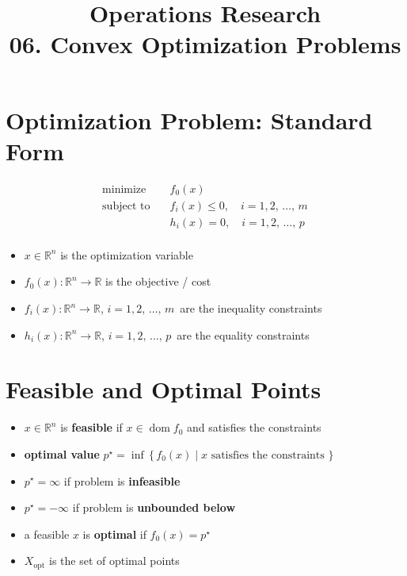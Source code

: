 \documentclass[11pt]{extarticle}
\newcommand{\ds}{\displaystyle}
\DeclareMathOperator*{\dom}{dom}
\theoremstyle{definition}
\begin{document}
\title{\texorpdfstring{\vspace{15mm} Operations Research\\ 06. Convex Optimization Problems}{Operations Research\\ 06. Convex Optimization Problems}} 
\author{}
\date{}
\maketitle
\newpage

\section*{Optimization Problem: Standard Form}

\vspace{5mm}
\begin{align*}
  \text{minimize}\quad &f_0(x) \\
  \text{subject to}\quad &f_i(x)\leqslant 0, \quad i = 1, 2,\,\ldots,\,m \\
  \qquad\qquad &h_i(x) = 0, \quad i = 1, 2,\,\ldots,\,p \\
\end{align*}
\begin{itemize}
  \item $\ds x\in\mathbb{R}^n$ is the optimization variable
  \item $\ds f_0(x):\mathbb{R}^n\to\mathbb{R}$ is the objective / cost 
  \item $\ds f_i(x):\mathbb{R}^n\to\mathbb{R}$, $i = 1, 2,\,\ldots,\,m\,$ are the inequality constraints 
  \item $\ds h_i(x):\mathbb{R}^n\to\mathbb{R}$, $i = 1, 2,\,\ldots,\,p\,$ are the equality constraints 
\end{itemize}

\newpage

\section*{Feasible and Optimal Points}

\vspace{1cm}
\begin{itemize}
  \item $x\in\mathbb{R}^n$ is {\bf feasible} if $x\in\dom f_0$ and satisfies the constraints
  \item {\bf optimal value} $\ds p^\star = \inf\,\{\,f_0(x)\;|\;\text{$x$ satisfies the constraints }\}$ 
  \item $p^\star = \infty$ if problem is {\bf infeasible}
  \item $p^\star = -\infty$ if problem is {\bf unbounded below}
  \item a feasible $x$ is {\bf optimal} if $\ds f_0(x) = p^\star$
  \item $X_{\text{opt}}$ is the set of optimal points
\end{itemize}
\end{document}
